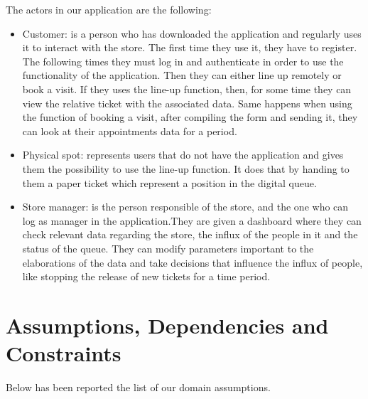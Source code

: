 The actors in our application are the following:

\begin{itemize}

	\item Customer: is a person who has downloaded the application and regularly uses it to interact with the store. The first time they use it, they have to register. The following times they must log in and authenticate in order to use the functionality of the application. Then they can either line up remotely or book a visit. If they uses the line-up function, then, for some time they can view the relative ticket with the associated data. Same happens
	when using the function of booking a visit, after compiling the form and sending it, they can look at their appointments data for a period.
	\item Physical spot: represents users that do not have the application and gives them the possibility to use the line-up function. It does that by handing to them a paper ticket which represent a position in the digital queue.
	\item Store manager: is the person responsible of the store, and the one who can log as manager in the application.They are given a dashboard where they can check relevant data regarding the store, the influx of the people in it and the status of the queue. They can modify parameters important to the elaborations of the data and take decisions that influence the influx of people, like stopping the release of new tickets for a time period. 

\end{itemize}

\section{Assumptions, Dependencies and Constraints}

Below has been reported the list of our domain assumptions.

